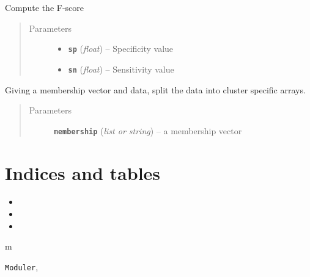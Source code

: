 \documentclass[letterpaper,10pt,english]{sphinxmanual}
\begin{document}
\begin{fulllineitems}
\label{Doc:Moduler.Fscore}
Compute the F-score
\begin{quote}\begin{description}
\item[{Parameters}] \leavevmode\begin{itemize}
\item {} 
\textbf{\texttt{sp}} (\emph{float}) -- Specificity value

\item {} 
\textbf{\texttt{sn}} (\emph{float}) -- Sensitivity value

\end{itemize}

\end{description}\end{quote}

\end{fulllineitems}


\begin{fulllineitems}
\label{Doc:Moduler.clus2list}
Giving a membership vector and data, split the data into cluster specific arrays.
\begin{quote}\begin{description}
\item[{Parameters}] \leavevmode
\textbf{\texttt{membership}} (\emph{list or string}) -- a membership vector

\end{description}\end{quote}

\end{fulllineitems}



\chapter{Indices and tables}
\label{index:indices-and-tables}\begin{itemize}
\item {} 

\item {} 

\item {} 

\end{itemize}


\renewcommand{\indexname}{Python Module Index}
\begin{theindex}
\def\bigletter#1{{\Large\sffamily#1}\nopagebreak\vspace{1mm}}
\bigletter{m}
\item {\texttt{Moduler}}, \pageref{Intro:module-Moduler}
\end{theindex}

\renewcommand{\indexname}{Index}
\printindex
\end{document}
